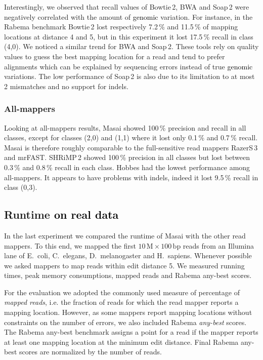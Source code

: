 \documentclass[a4,center,fleqn]{article}
\newcommand{\ie}{{i.e.}\xspace}
\begin{document}
Interestingly, we observed that recall values of Bowtie\,2, BWA and Soap\,2 were negatively correlated with the amount of \textcolor{black}{genomic} variation.
For instance, in the Rabema benchmark Bowtie\,2 lost respectively 7.2\,\% and 11.5\,\% of mapping locations at distance 4 and 5, but in this experiment it lost 17.5\,\% recall in class (4,0).
We noticed a similar trend for BWA and Soap\,2.
These tools rely on quality values to guess the best mapping location for a read and tend to prefer alignments which can be explained by sequencing errors instead of true \textcolor{black}{genomic} variations.
The low performance of Soap\,2 is also due to its limitation to at most 2 mismatches and no support for indels.

\subsubsection{All-mappers}
Looking at all-mappers results, Masai showed 100\,\% precision and recall in all classes, except for classes (2,0) and (1,1) where it lost only 0.1\,\% and 0.7\,\% recall.
Masai is therefore roughly comparable to the full-sensitive read mappers RazerS\,3 and mrFAST.
SHRiMP\,2 showed 100\,\% precision in all classes but lost between 0.3\,\% and 0.8\,\% recall in each class.
Hobbes had the lowest performance among all-mappers.
It appears to have problems with indels, indeed it lost 9.5\,\% recall in class (0,3).


\subsection{Runtime \textcolor{black}{on real data}}

In the last experiment we compared the runtime of Masai with the other read mappers.
To this end, we mapped the first $10\,\text{M}\times 100\,\text{bp}$ reads from an Illumina lane of E.~coli, C.~elegans, D.~melanogaster and H.~sapiens.
Whenever possible we asked mappers to map reads within edit distance 5.
We measured running times, peak memory consumptions, mapped reads and Rabema any-best scores.

For the evaluation we adopted the commonly used measure of percentage of \emph{mapped reads}, \ie the fraction of reads for which the read mapper reports a mapping location.
However, as some mappers report mapping locations without constraints on the number of errors, we also included Rabema \emph{any-best} scores.
The Rabema any-best benchmark assigns a point for a read if the mapper reports at least one mapping location at the minimum edit distance.
Final Rabema any-best scores are normalized by the number of reads.
\end{document}
